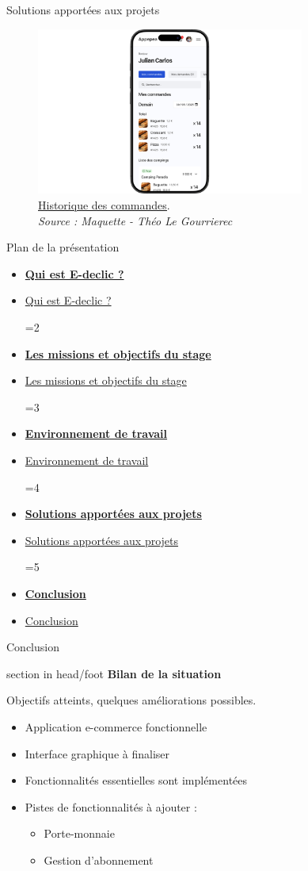 \documentclass{beamer}
\newcommand{\planLine}[4]{
  \ifnum#1=#2
    \item \hyperlink{#3}{\textbf{\large #4}}
  \else
    \item \hyperlink{#3}{#4}
  \fi
}
\newcommand{\planSlide}[1]{
  	\begin{frame}{Plan de la présentation}
  		\begin{center}
  			\begin{minipage}{1\textwidth}
				\begin{itemize}
      			\planLine{#1}{1}{organisation}{Qui est E-declic ?}
      			\planLine{#1}{2}{sujet}{Les missions et objectifs du stage}
      			\planLine{#1}{3}{environnement}{Environnement de travail}
      			\planLine{#1}{4}{realisation}{Solutions apportées aux projets}
      			\planLine{#1}{5}{conclusion}{Conclusion}
	    		\end{itemize}
  		\end{minipage}
	\end{center}
	\vfill
	\end{frame}
}
\begin{document}
\begin{frame}{Solutions apportées aux projets}
\begin{center}
		 {
			\addtocounter{figure}{1}
			\begin{figure}[t]
  				\includegraphics[height=5.5cm]{../img/maquette/historique_commande.png}
				\caption{	
					\centering
  					\href{https://github.com/Matteo-K/Soutenance_E-delic/blob/main/img/maquette/historique_commande.png}{\underline{Historique des commandes}}.\\
  					\textit{Source : Maquette - Théo Le Gourrierec}
				}
  				\label{fig:disponibilite_produit}
  			\end{figure}
		}
	\end{center}
	\vfill
\end{frame}

\planSlide{5}

\begin{frame}[label=conclusion]{Conclusion}
  	\begin{beamercolorbox}[wd=\paperwidth,ht=1.5em,dp=0.5em,leftskip=0.5cm]{section in head/foot}
  		\large \textbf{Bilan de la situation}
	\end{beamercolorbox}
	\vspace{0.5em}
	\begin{center}
  		\begin{minipage}{0.9\textwidth}
	  		Objectifs atteints, quelques améliorations possibles.
  			\begin{itemize}
  				\item Application e-commerce fonctionnelle
			  	\item Interface graphique à finaliser
			  	\item Fonctionnalités essentielles sont implémentées
			  	\item Pistes de fonctionnalités à ajouter : 
			  	\begin{itemize}
			  		\item Porte-monnaie
			  		\item Gestion d'abonnement
			  	\end{itemize}
			\end{itemize}
  		\end{minipage}
	\end{center}
	\vfill
\end{frame}
\end{document}
